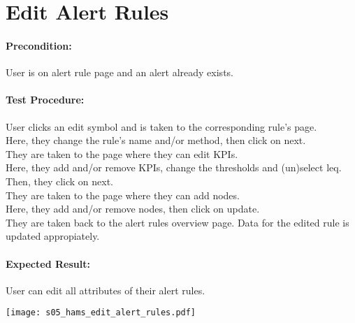 \documentclass{scrreprt}
\begin{document}
\begin{minipage}[c]{0.4\textwidth}
\section{Edit Alert Rules}

\paragraph{Precondition:}
User is on alert rule page and an alert already exists.\\

\paragraph{Test Procedure:}
User clicks an edit symbol and is taken to the corresponding rule's page. \\
Here, they change the rule's name and/or method, then click on next. \\
They are taken to the page where they can edit KPIs. \\
Here, they add and/or remove KPIs, change the thresholds and (un)select leq. Then, they click on next. \\
They are taken to the page where they can add nodes. \\
Here, they add and/or remove nodes, then click on update. \\
They are taken back to the alert rules overview page. Data for the edited rule is updated appropiately.


\paragraph{Expected Result:}
User can edit all attributes of their alert rules.

\end{minipage}
\hfill
\begin{minipage}[c]{0.5\textwidth}
	\texttt{[image: s05\_hams\_edit\_alert\_rules.pdf]}
\end{minipage}
\end{document}
